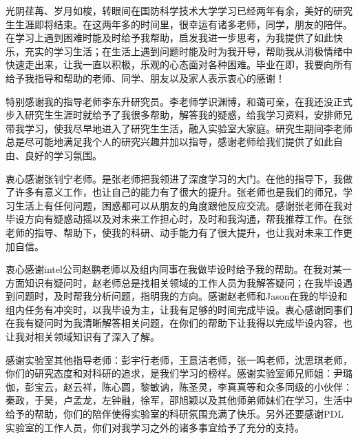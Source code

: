 

\begin{ack}
  光阴荏苒、岁月如梭，转眼间在国防科学技术大学学习已经两年有余，美好的研究生生涯即将结束。在这两年多的时间里，很幸运有诸多老师，同学，朋友的陪伴。在学习上遇到困难时能及时给予我帮助，启发我进一步思考，为我提供了如此快乐，充实的学习生活；在生活上遇到问题时能及时为我开导，帮助我从消极情绪中快速走出来，让我一直以积极，乐观的心态面对各种困难。毕业在即，我要向所有给予我指导和帮助的老师、同学、朋友以及家人表示衷心的感谢！
  
  特别感谢我的指导老师李东升研究员。李老师学识渊博，和蔼可亲，在我还没正式步入研究生生涯时就给予了我很多帮助，解答我的疑惑，给我学习资料，安排师兄带我学习，使我尽早地进入了研究生生活，融入实验室大家庭。研究生期间李老师总是尽可能地满足我个人的研究兴趣并加以指导，感谢老师给我们提供了如此自由、良好的学习氛围。
  
  衷心感谢张钊宁老师。是张老师把我领进了深度学习的大门。在他的指导下，我做了许多有意义工作，也让自己的能力有了很大的提升。张老师也是我们的师兄，学习生活上有任何问题，困惑都可以从朋友的角度跟他反应交流。感谢张老师在我对毕设方向有疑惑动摇以及对未来工作担心时，及时和我沟通，帮我推荐工作。在张老师的指导、帮助下，使我的科研、动手能力有了很大提升，也让我对未来工作更加自信。
  
  衷心感谢intel公司赵鹏老师以及组内同事在我做毕设时给予我的帮助。在我对某一方面知识有疑问时，赵老师总是找相关领域的工作人员为我解答疑问；在我毕设遇到问题时，及时帮我分析问题，指明我的方向。感谢赵老师和Jason在我的毕设和组内任务有冲突时，以我毕设为主，让我有足够的时间完成毕设。衷心感谢同事们在我有疑问时为我清晰解答相关问题，在你们的帮助下让我得以完成毕设内容，也让我对相关领域知识有了深入了解。
  
  感谢实验室其他指导老师：彭宇行老师，王意洁老师，张一鸣老师，沈思琪老师，你们的研究态度和对科研的追求，是我们学习的榜样。感谢实验室师兄师姐：尹璐伽，彭宝云，赵云祥，陈心圆，黎敏讷，陈圣灵，李真真等和众多同级的小伙伴：秦政，于昊，卢孟龙，左钟融，徐军，邵旭颖以及其他师弟师妹们在学习，生活中给予的帮助，你们的陪伴使得实验室的科研氛围充满了快乐。另外还要感谢PDL实验室的工作人员，你们对我学习之外的诸多事宜给予了充分的支持。

\end{ack}
